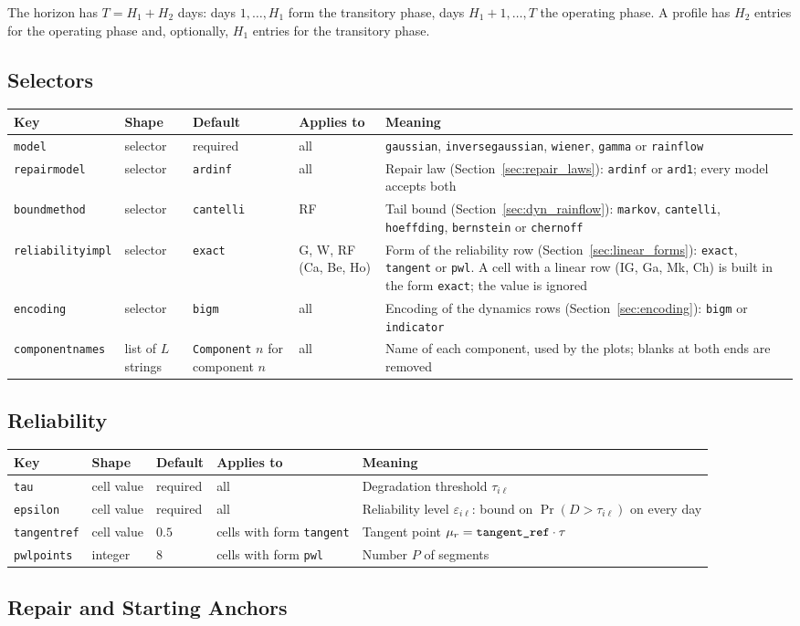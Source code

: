 \documentclass[11pt,a4paper]{article}
\makeatletter
\theoremstyle{plain}
\theoremstyle{definition}
\renewcommand{\_}{\textunderscore\allowbreak{}}
\providecommand{\keyrow}[5]{{\raggedright #1\par} & {\raggedright #2\par} & {\raggedright #3\par} & {\raggedright #4\par} & {\raggedright #5\par} \\}
\providecommand{\tabstart}[2]{\begingroup\small\begin{longtable}{@{}#1@{}}\toprule #2 \\ \midrule \endhead}
\providecommand{\tabend}{\bottomrule\end{longtable}\endgroup}
\providecommand{\keytab}{\tabstart{p{3.2cm}p{2.2cm}p{1.8cm}p{1.9cm}p{4.5cm}}{Key & Shape & Default & Applies to & Meaning}}
\makeatother
\begin{document}
The horizon has $T = H_1 + H_2$ days: days $1,\ldots,H_1$ form the transitory phase, days $H_1+1,\ldots,T$ the operating phase.
A profile has $H_2$ entries for the operating phase and, optionally, $H_1$ entries for the transitory phase.

\subsection{Selectors}\label{sec:input_selectors}

\keytab
\keyrow{\texttt{model}}{selector}{required}{all}{\texttt{gaussian}, \texttt{inverse\_gaussian}, \texttt{wiener}, \texttt{gamma} or \texttt{rainflow}}
\keyrow{\texttt{repair\_model}}{selector}{\texttt{ardinf}}{all}{Repair law (Section~\ref{sec:repair_laws}): \texttt{ardinf} or \texttt{ard1}; every model accepts both}
\keyrow{\texttt{bound\_method}}{selector}{\texttt{cantelli}}{RF}{Tail bound (Section~\ref{sec:dyn_rainflow}): \texttt{markov}, \texttt{cantelli}, \texttt{hoeffding}, \texttt{bernstein} or \texttt{chernoff}}
\keyrow{\texttt{reliability\_impl}}{selector}{\texttt{exact}}{G, W, RF (Ca, Be, Ho)}{Form of the reliability row (Section~\ref{sec:linear_forms}): \texttt{exact}, \texttt{tangent} or \texttt{pwl}. A cell with a linear row (IG, Ga, Mk, Ch) is built in the form \texttt{exact}; the value is ignored}
\keyrow{\texttt{encoding}}{selector}{\texttt{bigm}}{all}{Encoding of the dynamics rows (Section~\ref{sec:encoding}): \texttt{bigm} or \texttt{indicator}}
\keyrow{\texttt{component\_names}}{list of $L$ strings}{\texttt{Component} $n$ for component $n$}{all}{Name of each component, used by the plots; blanks at both ends are removed}
\tabend

\subsection{Reliability}\label{sec:input_reliability}

\keytab
\keyrow{\texttt{tau}}{cell value}{required}{all}{Degradation threshold $\tau_{i\ell}$}
\keyrow{\texttt{epsilon}}{cell value}{required}{all}{Reliability level $\varepsilon_{i\ell}$: bound on $\Pr(D > \tau_{i\ell})$ on every day}
\keyrow{\texttt{tangent\_ref}}{cell value}{$0.5$}{cells with form \texttt{tangent}}{Tangent point $\mu_r = \texttt{tangent\_ref}\cdot\tau$}
\keyrow{\texttt{pwl\_points}}{integer}{$8$}{cells with form \texttt{pwl}}{Number $P$ of segments}
\tabend

\subsection{Repair and Starting Anchors}\label{sec:input_repair}
\end{document}
